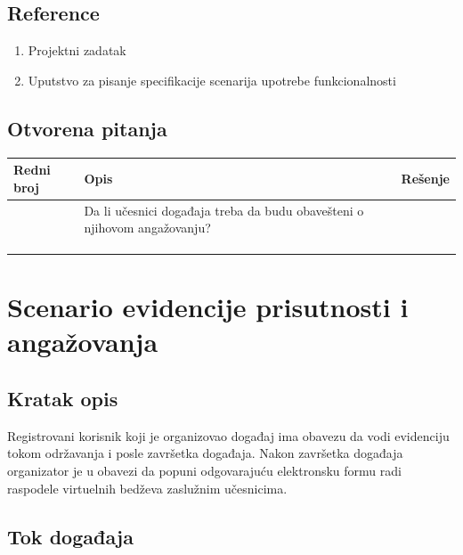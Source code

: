 \documentclass[11pt,a4paper]{article}
\begin{document}
\subsection{Reference}
\begin{enumerate}
    \item Projektni zadatak
    \item Uputstvo za pisanje specifikacije scenarija upotrebe funkcionalnosti
\end{enumerate}
\subsection{Otvorena pitanja}
\begin{center}
\begin{tabular}{| >{\centering\arraybackslash}m{1.9cm} | >{\centering\arraybackslash}m{4.9cm} | >{\centering\arraybackslash}m{4.9cm} |}
\hline
\rowcolor[HTML]{000000} 
{\color[HTML]{FFFFFF} Redni broj } & {\color[HTML]{FFFFFF} Opis } & {\color[HTML]{FFFFFF} Rešenje } \\ \hline
1 & Da li učesnici događaja treba da budu obavešteni o njihovom angažovanju? & \\ \hline
 &  &  \\ \hline
 &  &  \\ \hline
 &  &  \\ \hline
\end{tabular}
\end{center}

\newpage

\section{Scenario evidencije prisutnosti i angažovanja}
\subsection{Kratak opis}
Registrovani korisnik koji je organizovao događaj ima obavezu da vodi evidenciju tokom održavanja i posle završetka događaja. Nakon završetka događaja organizator je u obavezi da popuni odgovarajuću elektronsku formu radi raspodele virtuelnih bedževa zaslužnim učesnicima.
\subsection{Tok događaja}
\end{document}
